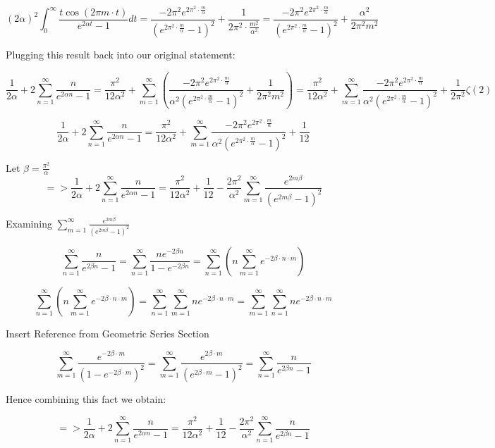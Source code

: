 \documentclass[a4paper]{article}
\begin{document}
$$
(2\alpha)^2\int_{0}^{\infty}\frac{t\cos(2 \pi m \cdot t)}{e^{2\alpha t}-1}dt
=\frac{-2\pi^2e^{2\pi^2 \cdot \frac{m}{\alpha}}}{(e^{2\pi^2 \cdot \frac{m}{\alpha}}-1)^2} + \frac{1}{2\pi^2 \cdot \frac{m^2}{\alpha^2}}
=\frac{-2\pi^2e^{2\pi^2 \cdot \frac{m}{\alpha}}}{(e^{2\pi^2 \cdot \frac{m}{\alpha}}-1)^2} + \frac{\alpha^2}{2\pi^2 m^2}
$$

Plugging this result back into our original statement:

$$\frac{1}{2\alpha} + 2\sum_{n=1}^{\infty} \frac{n}{e^{2\alpha n}-1}
=\frac{\pi^2}{12\alpha^2} + \sum_{m=1}^{\infty} (\frac{-2\pi^2e^{2\pi^2 \cdot \frac{m}{\alpha}}}{\alpha^2(e^{2\pi^2 \cdot \frac{m}{\alpha}}-1)^2} + \frac{1}{2\pi^2 m^2})
=\frac{\pi^2}{12\alpha^2} + \sum_{m=1}^{\infty} \frac{-2\pi^2e^{2\pi^2 \cdot \frac{m}{\alpha}}}{\alpha^2(e^{2\pi^2 \cdot \frac{m}{\alpha}}-1)^2} + \frac{1}{2\pi^2}\zeta(2)
$$

$$
\frac{1}{2\alpha} + 2\sum_{n=1}^{\infty} \frac{n}{e^{2\alpha n}-1}
=\frac{\pi^2}{12\alpha^2} + \sum_{m=1}^{\infty} \frac{-2\pi^2e^{2\pi^2 \cdot \frac{m}{\alpha}}}{\alpha^2(e^{2\pi^2 \cdot \frac{m}{\alpha}}-1)^2} + \frac{1}{12}
$$

Let $\beta = \frac{\pi^2}{\alpha}$
$$=>
\frac{1}{2\alpha} + 2\sum_{n=1}^{\infty} \frac{n}{e^{2\alpha n}-1}
=\frac{\pi^2}{12\alpha^2}+ \frac{1}{12} -\frac{2\pi^2}{\alpha^2}\sum_{m=1}^{\infty} \frac{e^{2m\beta}}{(e^{2m\beta}-1)^2}
$$

Examining $\sum_{m=1}^{\infty} \frac{e^{2m\beta}}{(e^{2m\beta}-1)^2}$

$$
\sum_{n=1}^{\infty} \frac{n}{e^{2\beta n}-1}
=\sum_{n=1}^{\infty} \frac{ne^{-2\beta n}}{1-e^{-2\beta n}}
=\sum_{n=1}^{\infty} (n\sum_{m=1}^{\infty} e^{-2\beta \cdot n \cdot m})
$$

$$
\sum_{n=1}^{\infty} (n\sum_{m=1}^{\infty} e^{-2\beta \cdot n \cdot m})
=\sum_{n=1}^{\infty}\sum_{m=1}^{\infty} ne^{-2\beta \cdot n \cdot m}
=\sum_{m=1}^{\infty}\sum_{n=1}^{\infty} ne^{-2\beta \cdot n \cdot m}
$$

Insert Reference from Geometric Series Section

$$
\sum_{m=1}^{\infty}\frac{e^{-2\beta \cdot m}}{(1-e^{-2\beta \cdot m})^2}
=\sum_{m=1}^{\infty}\frac{e^{2\beta \cdot m}}{(e^{2\beta \cdot m}-1)^2}
=\sum_{n=1}^{\infty} \frac{n}{e^{2\beta n}-1}
$$

Hence combining this fact we obtain:

$$=>
\frac{1}{2\alpha} + 2\sum_{n=1}^{\infty} \frac{n}{e^{2\alpha n}-1}
=\frac{\pi^2}{12\alpha^2}+ \frac{1}{12} -\frac{2\pi^2}{\alpha^2}\sum_{n=1}^{\infty} \frac{n}{e^{2\beta n}-1}
$$
\end{document}
